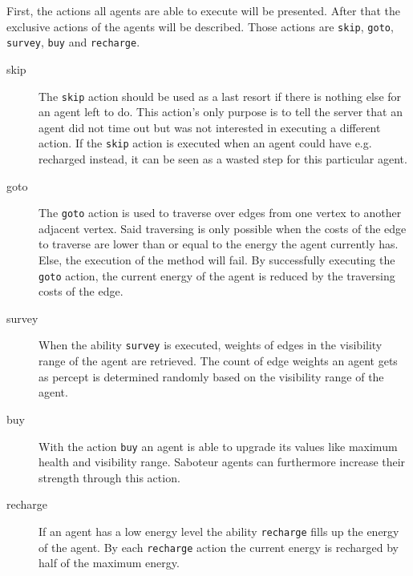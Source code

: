 First, the actions all agents are able to execute will be presented. After that the exclusive actions of the agents will be described.
Those actions are \texttt{skip}, \texttt{goto}, \texttt{survey}, \texttt{buy} and \texttt{recharge}.
\begin{description}
   \item[skip] The \texttt{skip} action should be used as a last resort if there is nothing else for an agent left to do.
    This action's only purpose is to tell the server that an agent did not time out but was not interested in executing a different action.
    If the \texttt{skip} action is executed when an agent could have e.g. recharged instead, it can be seen as a wasted step for this particular agent.
   \item[goto] The \texttt{goto} action is used to traverse over edges from one vertex to another adjacent vertex.
    Said traversing is only possible when the costs of the edge to traverse are lower than or equal to the energy the agent currently has.
    Else, the execution of the method will fail.
    By successfully executing the \texttt{goto} action, the current energy of the agent is reduced by the traversing costs of the edge.
   \item[survey] When the ability \texttt{survey} is executed, weights of edges in the visibility range of the agent are retrieved.
    The count of edge weights an agent gets as percept is determined randomly based on the visibility range of the agent.
   \item[buy] With the action \texttt{buy} an agent is able to upgrade its values like maximum health and visibility range.
    Saboteur agents can furthermore increase their strength through this action.
   \item[recharge] If an agent has a low energy level the ability \texttt{recharge} fills up the energy of the agent.
    By each \texttt{recharge} action the current energy is recharged by half of the maximum energy.
\end{description}

